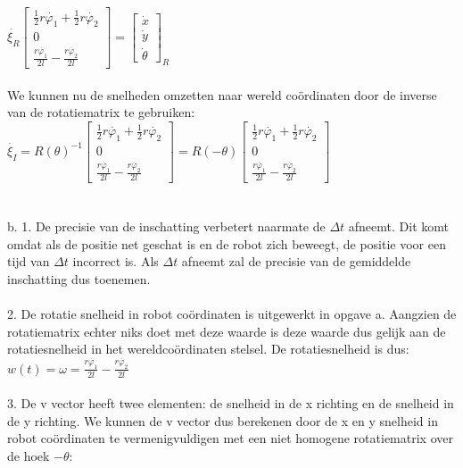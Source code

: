 \documentclass[a4paper]{article}
\begin{document}
$
\dot{\xi_{R}}
\begin{bmatrix}
\frac{1}{2}r\dot{\varphi_{1}} + \frac{1}{2}r\dot{\varphi_{2}} \\
0\\
\frac{r\dot{\varphi_{1}}}{2l}-\frac{r\dot{\varphi_{2}}}{2l}
\end{bmatrix}
=
\begin{bmatrix}
\dot{x} \\
\dot{y} \\
\dot{\theta}
\end{bmatrix}_{R}
$
\\\\
We kunnen nu de snelheden omzetten naar wereld co\"ordinaten door de inverse van de rotatiematrix te gebruiken:\\
$
\dot{\xi_{I}}=
R(\theta)^{-1}
\begin{bmatrix}
\frac{1}{2}r\dot{\varphi_{1}} + \frac{1}{2}r\dot{\varphi_{2}} \\
0\\
\frac{r\dot{\varphi_{1}}}{2l}-\frac{r\dot{\varphi_{2}}}{2l}
\end{bmatrix}
=
R(-\theta)
\begin{bmatrix}
\frac{1}{2}r\dot{\varphi_{1}} + \frac{1}{2}r\dot{\varphi_{2}} \\
0\\
\frac{r\dot{\varphi_{1}}}{2l}-\frac{r\dot{\varphi_{2}}}{2l}
\end{bmatrix}
$
\\\\\\
b. 1. De precisie van de inschatting verbetert naarmate de $\Delta t$ afneemt. Dit komt omdat als de positie net geschat is en de robot zich beweegt, de positie voor een tijd van $\Delta t$ incorrect is. Als $\Delta t$ afneemt zal de precisie van de gemiddelde inschatting dus toenemen.\\\\
2. De rotatie snelheid in robot co\"ordinaten is uitgewerkt in opgave a. Aangzien de rotatiematrix echter niks doet met deze waarde is deze waarde dus gelijk aan de rotatiesnelheid in het wereldco\"ordinaten stelsel. De rotatiesnelheid is dus:\\
$w(t) = \omega=\frac{r\dot{\varphi_{1}}}{2l}-\frac{r\dot{\varphi_{2}}}{2l}$\\\\
3. De v vector heeft twee elementen: de snelheid in de x richting en de snelheid in de y richting. We kunnen de v vector dus berekenen door de x en y snelheid in robot co\"ordinaten te vermenigvuldigen met een niet homogene rotatiematrix over de hoek $-\theta$:\\\\
\end{document}
